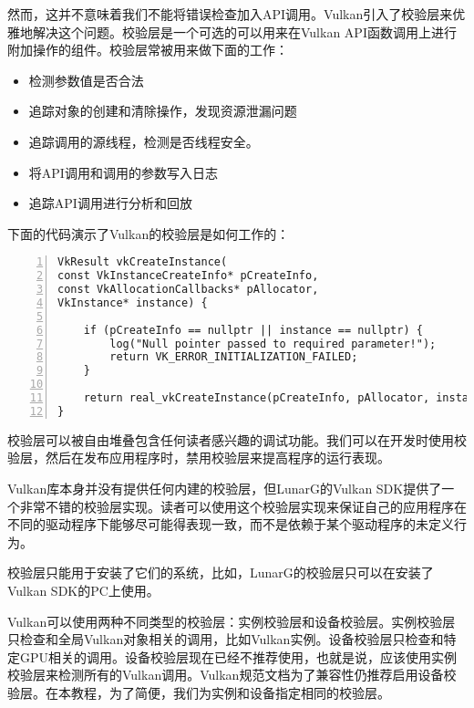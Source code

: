 \documentclass{ctexart}
\begin{document}
然而，这并不意味着我们不能将错误检查加入API调用。Vulkan引入了校验层来优雅地解决这个问题。校验层是一个可选的可以用来在Vulkan API函数调用上进行附加操作的组件。校验层常被用来做下面的工作：

\begin{itemize}
	\item 检测参数值是否合法
	\item 追踪对象的创建和清除操作，发现资源泄漏问题
	\item 追踪调用的源线程，检测是否线程安全。
	\item 将API调用和调用的参数写入日志
	\item 追踪API调用进行分析和回放
\end{itemize}

下面的代码演示了Vulkan的校验层是如何工作的：

\begin{lstlisting}[language={[ANSI]C},keywordstyle=\color{blue!70},commentstyle=\color{red!50!green!50!blue!50},frame=shadowbox, rulesepcolor=\color{red!20!green!20!blue!20},basicstyle=\small,numbers=left, numberstyle=\tiny,breaklines=true]
VkResult vkCreateInstance(
const VkInstanceCreateInfo* pCreateInfo,
const VkAllocationCallbacks* pAllocator,
VkInstance* instance) {

	if (pCreateInfo == nullptr || instance == nullptr) {
		log("Null pointer passed to required parameter!");
		return VK_ERROR_INITIALIZATION_FAILED;
	}

	return real_vkCreateInstance(pCreateInfo, pAllocator, instance);
}
\end{lstlisting}

校验层可以被自由堆叠包含任何读者感兴趣的调试功能。我们可以在开发时使用校验层，然后在发布应用程序时，禁用校验层来提高程序的运行表现。

Vulkan库本身并没有提供任何内建的校验层，但LunarG的Vulkan SDK提供了一个非常不错的校验层实现。读者可以使用这个校验层实现来保证自己的应用程序在不同的驱动程序下能够尽可能得表现一致，而不是依赖于某个驱动程序的未定义行为。

校验层只能用于安装了它们的系统，比如，LunarG的校验层只可以在安装了Vulkan SDK的PC上使用。

Vulkan可以使用两种不同类型的校验层：实例校验层和设备校验层。实例校验层只检查和全局Vulkan对象相关的调用，比如Vulkan实例。设备校验层只检查和特定GPU相关的调用。设备校验层现在已经不推荐使用，也就是说，应该使用实例校验层来检测所有的Vulkan调用。Vulkan规范文档为了兼容性仍推荐启用设备校验层。在本教程，为了简便，我们为实例和设备指定相同的校验层。
\end{document}
